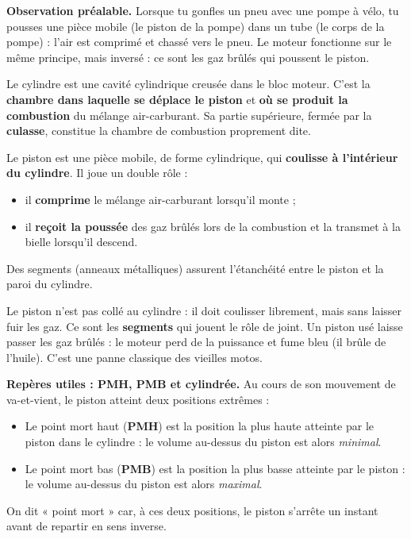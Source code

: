 \documentclass[11pt]{article}
\newcommand{\cle}[1]{{\popxbold\color{popdark}#1}}
\newcounter{popsec}
\newcounter{popsub}
\newcommand{\courssub}[1]{%
  \stepcounter{popsub}%
  \par\vspace{9pt}\noindent{\popxbold\fontsize{11.5}{13}\selectfont\color{popink}{\color{poporange}\thepopsec.\thepopsub}\hspace{6pt}#1}\par\nopagebreak\vspace{4pt}
}
\begin{document}
\courssub{Le cylindre et le piston : le c\oe ur du moteur}

\textbf{Observation préalable.} Lorsque tu gonfles un pneu avec une pompe à vélo, tu pousses une pièce mobile (le piston de la pompe) dans un tube (le corps de la pompe) : l'air est comprimé et chassé vers le pneu. Le moteur fonctionne sur le même principe, mais inversé : ce sont les gaz brûlés qui poussent le piston.

\begin{definition}[Le cylindre]
Le \cle{cylindre} est une cavité cylindrique creusée dans le bloc moteur. C'est la \textbf{chambre dans laquelle se déplace le piston} et \textbf{où se produit la combustion} du mélange air-carburant. Sa partie supérieure, fermée par la \textbf{culasse}, constitue la chambre de combustion proprement dite.
\end{definition}

\begin{definition}[Le piston]
Le \cle{piston} est une pièce mobile, de forme cylindrique, qui \textbf{coulisse à l'intérieur du cylindre}. Il joue un double rôle :
\begin{itemize}
\item il \textbf{comprime} le mélange air-carburant lorsqu'il monte ;
\item il \textbf{reçoit la poussée} des gaz brûlés lors de la combustion et la transmet à la bielle lorsqu'il descend.
\end{itemize}
Des segments (anneaux métalliques) assurent l'étanchéité entre le piston et la paroi du cylindre.
\end{definition}

\begin{attention}
Le piston n'est pas collé au cylindre : il doit coulisser librement, mais sans laisser fuir les gaz. Ce sont les \textbf{segments} qui jouent le rôle de joint. Un piston usé laisse passer les gaz brûlés : le moteur perd de la puissance et fume bleu (il brûle de l'huile). C'est une panne classique des vieilles motos.
\end{attention}

\textbf{Repères utiles : PMH, PMB et cylindrée.} Au cours de son mouvement de va-et-vient, le piston atteint deux positions extrêmes :

\begin{definition}
\begin{itemize}
\item Le \cle{point mort haut} (\textbf{PMH}) est la position la plus haute atteinte par le piston dans le cylindre : le volume au-dessus du piston est alors \emph{minimal}.
\item Le \cle{point mort bas} (\textbf{PMB}) est la position la plus basse atteinte par le piston : le volume au-dessus du piston est alors \emph{maximal}.
\end{itemize}
On dit « point mort » car, à ces deux positions, le piston s'arrête un instant avant de repartir en sens inverse.
\end{definition}
\end{document}

